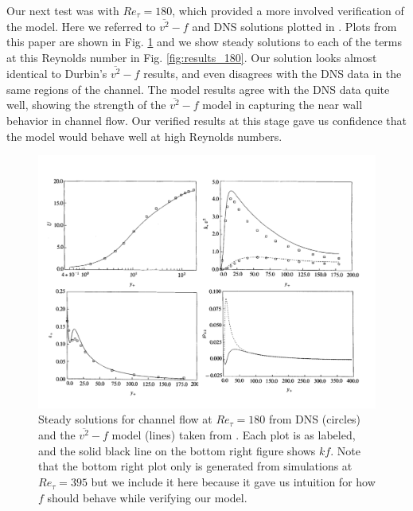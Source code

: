 \documentclass[a4paper,11pt]{article}
\begin{document}
Our next test was with $Re_\tau = 180$, which provided a more involved
verification of the model. Here we referred to $\overline{v^2} - f$ and DNS
solutions plotted in \cite{durbin180}. Plots from this paper are shown in Fig.
\ref{fig:durbin180} and we show steady solutions to each of the terms
at this Reynolds number in Fig. \ref{fig:results_180}. Our solution looks almost
identical to Durbin's $\overline{v^2}-f$ results, and even disagrees with the DNS
data in the same regions of the channel. The model results agree with the DNS
data quite well, showing the strength of the $\overline{v^2}-f$ model
in capturing the near wall behavior in channel flow. Our verified results at
this stage gave us confidence that the model would behave well at high Reynolds
numbers.

\begin{figure}
 \centering
 \includegraphics[width=\textwidth]{durbin180}
 \caption{Steady solutions for channel flow at $Re_\tau=180$ from DNS (circles)
and the $\overline{v^2}-f$ model (lines) taken from \cite{durbin180}. Each plot
is as labeled, and the solid black line on the bottom right figure shows $kf$.
Note that the bottom right plot only is generated from simulations at $Re_\tau =
395$ but we include it here because it gave us intuition for how $f$ should
behave while verifying our model.}
 \label{fig:durbin180}
\end{figure}
\end{document}

